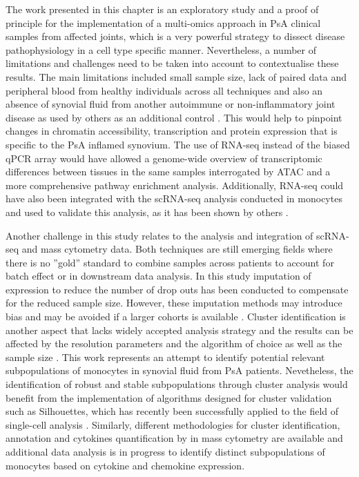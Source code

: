 The work presented in this chapter is an exploratory study and a proof of principle for the implementation of a multi-omics approach in PsA clinical samples from affected joints, which is a very powerful strategy to dissect disease pathophysiology in a cell type specific manner. Nevertheless, a number of limitations and challenges need to be taken into account to contextualise these results. The main limitations included small sample size, lack of paired data and peripheral blood from healthy individuals across all techniques and also an absence of synovial fluid from another autoimmune or non-inflammatory joint disease as used by others as an additional control \parencite{Fumitaka2018, Dolcino2015,Zhang2018}. This would help to pinpoint changes in chromatin accessibility, transcription and protein expression that is specific to the PsA inflamed synovium. The use of RNA-seq instead of the biased qPCR array would have allowed a genome-wide overview of transcriptomic differences between tissues in the same samples interrogated by ATAC and a more comprehensive pathway enrichment analysis. Additionally, RNA-seq could have also been integrated with the scRNA-seq analysis conducted in monocytes and used to validate this analysis, as it has been shown by others \parencite{Zhang2018}. 

Another challenge in this study relates to the analysis and integration of scRNA-seq and mass cytometry data. Both techniques are still emerging fields where there is no ''gold'' standard to combine samples across patients to account for batch effect or in downstream data analysis. In this study imputation of expression to reduce the number of drop outs has been conducted to compensate for the reduced sample size. However, these imputation methods may introduce bias and may be avoided if a larger cohorts is available \parencite{Andrews2018}. Cluster identification is another aspect that lacks widely accepted analysis strategy and the results can be affected by the resolution parameters and the algorithm of choice as well as the sample size \parencite{Kiselev2019}. This work represents an attempt to identify potential relevant subpopulations of monocytes in synovial fluid from PsA patients. Nevetheless, the identification of robust and stable subpopulations through cluster analysis would benefit from the implementation of algorithms designed for cluster validation such as Silhouettes, which has recently been successfully applied to the field of single-cell analysis \parencite{Rousseeuw1987,Zhang2018}. Similarly, different methodologies for cluster identification, annotation and cytokines quantification by in mass cytometry are available and additional data analysis is in progress to identify distinct subpopulations of monocytes based on cytokine and chemokine expression. %

